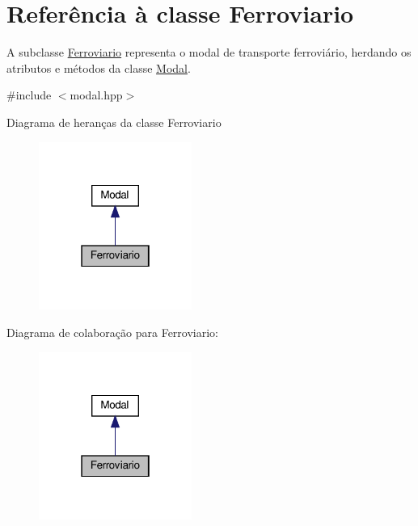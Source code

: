 \hypertarget{classFerroviario}{}\section{Referência à classe Ferroviario}
\label{classFerroviario}


A subclasse \hyperlink{classFerroviario}{Ferroviario} representa o modal de transporte ferroviário, herdando os atributos e métodos da classe \hyperlink{classModal}{Modal}.  




{\ttfamily \#include $<$modal.\+hpp$>$}



Diagrama de heranças da classe Ferroviario
\nopagebreak
\begin{figure}[H]
\begin{center}
\leavevmode
\includegraphics[width=142pt]{classFerroviario__inherit__graph}
\end{center}
\end{figure}


Diagrama de colaboração para Ferroviario\+:
\nopagebreak
\begin{figure}[H]
\begin{center}
\leavevmode
\includegraphics[width=142pt]{classFerroviario__coll__graph}
\end{center}
\end{figure}
